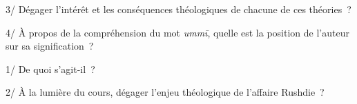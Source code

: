 3/ Dégager l'intérêt et les conséquences théologiques de chacune de ces
théories~?

4/ À propos de la compréhension du mot \emph{ummī}, quelle est la
position de l'auteur sur sa signification~?


1/ De quoi s'agit-il~?

2/ À la lumière du cours, dégager l'enjeu théologique de l'affaire
Rushdie~?

